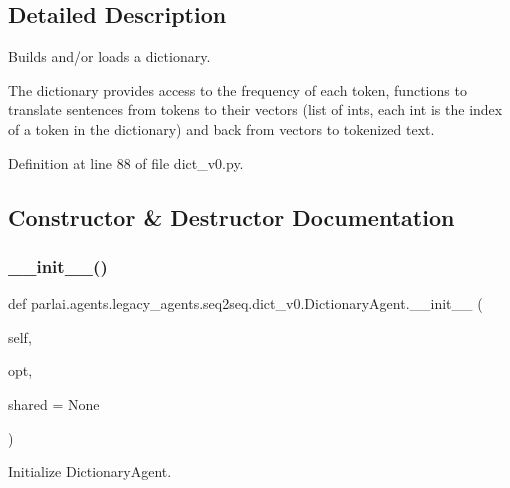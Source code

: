 \subsection{Detailed Description}
\begin{DoxyVerb}Builds and/or loads a dictionary.

The dictionary provides access to the frequency of each token, functions to
translate sentences from tokens to their vectors (list of ints, each int is the
index of a token in the dictionary) and back from vectors to tokenized text.
\end{DoxyVerb}
 

Definition at line 88 of file dict\+\_\+v0.\+py.



\subsection{Constructor \& Destructor Documentation}
\mbox{\label{classparlai_1_1agents_1_1legacy__agents_1_1seq2seq_1_1dict__v0_1_1DictionaryAgent_ace91e7215f1a4688abaa3235e2c19d56}} 
\subsubsection{\texorpdfstring{\+\_\+\+\_\+init\+\_\+\+\_\+()}{\_\_init\_\_()}}
{\footnotesize\ttfamily def parlai.\+agents.\+legacy\+\_\+agents.\+seq2seq.\+dict\+\_\+v0.\+Dictionary\+Agent.\+\_\+\+\_\+init\+\_\+\+\_\+ (\begin{DoxyParamCaption}\item[{}]{self,  }\item[{}]{opt,  }\item[{}]{shared = {\ttfamily None} }\end{DoxyParamCaption})}

\begin{DoxyVerb}Initialize DictionaryAgent.
\end{DoxyVerb}
 


